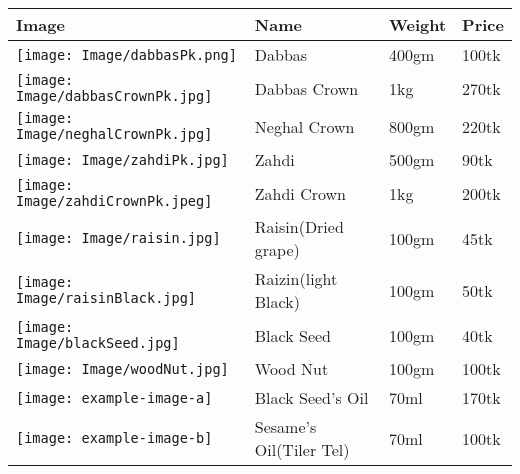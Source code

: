 \documentclass[a4paper,12pt]{standalone}
\begin{document}
\centering
\begin{tabular}{llll}
\toprule
Image & Name & Weight & Price\\
\toprule
\hspace*{-.8cm}\texttt{[image: Image/dabbasPk.png]} & Dabbas & 400gm & 100tk\\
\texttt{[image: Image/dabbasCrownPk.jpg]} & Dabbas Crown & 1kg & 270tk\\
\hspace*{-.15cm}\texttt{[image: Image/neghalCrownPk.jpg]} & Neghal Crown & 800gm & 220tk\\
\texttt{[image: Image/zahdiPk.jpg]} & Zahdi & 500gm & 90tk\\
\texttt{[image: Image/zahdiCrownPk.jpeg]} & Zahdi Crown & 1kg & 200tk\\
\texttt{[image: Image/raisin.jpg]} & Raisin(Dried grape) & 100gm & 45tk\\
\texttt{[image: Image/raisinBlack.jpg]} & Raizin(light Black) & 100gm & 50tk\\
\texttt{[image: Image/blackSeed.jpg]} & Black Seed & 100gm & 40tk\\
\texttt{[image: Image/woodNut.jpg]} & Wood Nut & 100gm & 100tk\\
\texttt{[image: example-image-a]} & Black Seed's Oil & 70ml & 170tk\\
\texttt{[image: example-image-b]} & Sesame's Oil(Tiler Tel) & 70ml & 100tk\\
\bottomrule
\end{tabular}
\end{document}
